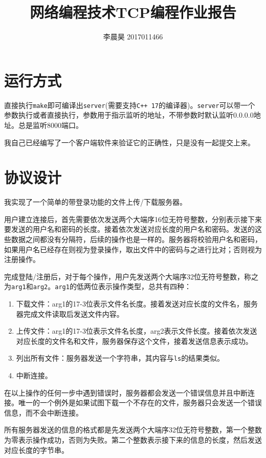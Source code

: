 \documentclass[12pt, UTF8]{article}
\title{网络编程技术TCP编程作业报告}
\author{李晨昊 2017011466}
\begin{document}
\maketitle
\tableofcontents

\section{运行方式}

直接执行\lstinline|make|即可编译出\lstinline|server|(需要支持\lstinline|C++ 17|的编译器)。\lstinline|server|可以带一个参数执行或者直接执行，参数用于指示监听的地址，不带参数时默认监听0.0.0.0地址。总是监听8000端口。

我自己已经编写了一个客户端软件来验证它的正确性，只是没有一起提交上来。

\section{协议设计}

我实现了一个简单的带登录功能的文件上传/下载服务器。

用户建立连接后，首先需要依次发送两个大端序16位无符号整数，分别表示接下来要发送的用户名和密码的长度。接着依次发送对应长度的用户名和密码。发送的这些数据之间都没有分隔符，后续的操作也是一样的。服务器将校验用户名和密码，如果用户名已经存在则视为登录操作，取出文件中的密码与之进行比对；否则视为注册操作。

完成登陆/注册后，对于每个操作，用户先发送两个大端序32位无符号整数，称之为\lstinline|arg1|和\lstinline|arg2|。\lstinline|arg1|的低两位表示操作类型，总共有四种：

\begin{enumerate}[label = \arabic*:, start = 0]
  \item 下载文件：arg1的17-3位表示文件名长度。接着发送对应长度的文件名，服务器完成文件读取后发送文件内容。
  \item 上传文件：arg1的17-3位表示文件名长度，arg2表示文件长度。接着依次发送对应长度的文件名和文件，服务器保存这个文件，接着发送信息表示成功。
  \item 列出所有文件：服务器发送一个字符串，其内容与\lstinline|ls|的结果类似。
  \item 中断连接。
\end{enumerate}

在以上操作的任何一步中遇到错误时，服务器都会发送一个错误信息并且中断连接。唯一的一个例外是如果试图下载一个不存在的文件，服务器只会发送一个错误信息，而不会中断连接。

所有服务器发送的信息的格式都是先发送两个大端序32位无符号整数，第一个整数为零表示操作成功，否则为失败。第二个整数表示接下来的信息的长度，然后发送对应长度的字节串。
\end{document}
